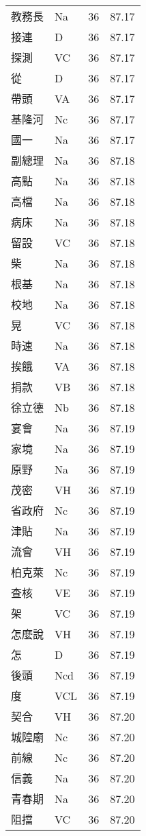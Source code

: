 \documentclass[twocolumn]{book}
\begin{document}
\begin{supertabular}{llrr}
教務長 & Na & 36 &  87.17\\
接連 & D & 36 &  87.17\\
探測 & VC & 36 &  87.17\\
從 & D & 36 &  87.17\\
帶頭 & VA & 36 &  87.17\\
基隆河 & Nc & 36 &  87.17\\
國一 & Na & 36 &  87.17\\
副總理 & Na & 36 &  87.18\\
高點 & Na & 36 &  87.18\\
高檔 & Na & 36 &  87.18\\
病床 & Na & 36 &  87.18\\
留設 & VC & 36 &  87.18\\
柴 & Na & 36 &  87.18\\
根基 & Na & 36 &  87.18\\
校地 & Na & 36 &  87.18\\
晃 & VC & 36 &  87.18\\
時速 & Na & 36 &  87.18\\
挨餓 & VA & 36 &  87.18\\
捐款 & VB & 36 &  87.18\\
徐立德 & Nb & 36 &  87.18\\
宴會 & Na & 36 &  87.19\\
家境 & Na & 36 &  87.19\\
原野 & Na & 36 &  87.19\\
茂密 & VH & 36 &  87.19\\
省政府 & Nc & 36 &  87.19\\
津貼 & Na & 36 &  87.19\\
流會 & VH & 36 &  87.19\\
柏克萊 & Nc & 36 &  87.19\\
查核 & VE & 36 &  87.19\\
架 & VC & 36 &  87.19\\
怎麼說 & VH & 36 &  87.19\\
怎 & D & 36 &  87.19\\
後頭 & Ncd & 36 &  87.19\\
度 & VCL & 36 &  87.19\\
契合 & VH & 36 &  87.20\\
城隍廟 & Nc & 36 &  87.20\\
前線 & Nc & 36 &  87.20\\
信義 & Na & 36 &  87.20\\
青春期 & Na & 36 &  87.20\\
阻擋 & VC & 36 &  87.20\\

\end{supertabular}
\end{document}
